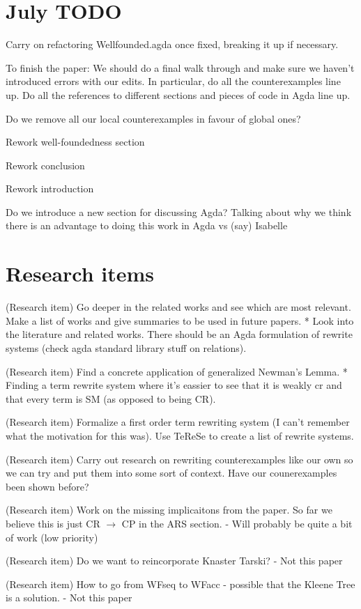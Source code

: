 \documentclass{article}
\begin{document}
\section*{July TODO}
\begin{todolist}
  \item Carry on refactoring Wellfounded.agda once fixed, breaking it up if necessary.
  \item To finish the paper: We should do a final walk through and make sure we haven't introduced errors with our edits. In particular, do all the counterexamples line up. Do all the references to different sections and pieces of code in Agda line up. 
  \item Do we remove all our local counterexamples in favour of global ones?
  \item Rework well-foundedness section 
  \item Rework conclusion 
  \item Rework introduction 
  \item Do we introduce a new section for discussing Agda? Talking about why we think there is an advantage to doing this work in Agda vs (say) Isabelle 

\end{todolist}

\section*{Research items}
\begin{todolist}
  \item (Research item) Go deeper in the related works and see which are most relevant. Make a list of works and give summaries to be used in future papers. * Look into the literature and related works. There should be an Agda formulation of rewrite systems (check agda standard library stuff on relations). 
  \item (Research item) Find a concrete application of generalized Newman's Lemma. * Finding a term rewrite system where it's eassier to see that it is weakly cr and that every term is SM (as opposed to being CR).  
  \item (Research item) Formalize a first order term rewriting system (I can't remember what the motivation for this was). Use TeReSe to create a list of rewrite systems.
  \item (Research item) Carry out research on rewriting counterexamples like our own so we can try and put them into some sort of context. Have our counerexamples been shown before?
  \item (Research item) Work on the missing implicaitons from the paper. So far we believe this is just CR $\to$ CP in the ARS section. - Will probably be quite a bit of work (low priority)
  \item (Research item) Do we want to reincorporate Knaster Tarski? - Not this paper 
  \item (Research item) How to go from WFseq to WFacc - possible that the Kleene Tree is a solution. - Not this paper
  
\end{todolist}
\end{document}
